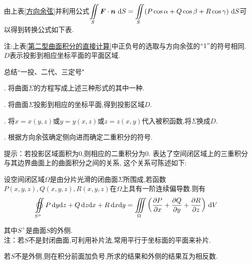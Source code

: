 \ttheorem[直接转换为二重积分计算]
由上表\ref{方向余弦}并利用公式$\displaystyle \iint\limits_{S}\bm{F}\cdot \bm{n}\,\,{\rm{d}} S=\iint\limits_{S}(P\cos \alpha +Q\cos \beta +R\cos \gamma )\,\,{\rm{d}} S$可以得到转换公式如下表.
\begin{table}[h]
	\centering
	\renewcommand{\arraystretch}{1.6}
	\caption{转换为二重积分计算的计算公式}
	\renewcommand{\arraystretch}{1}
	\label{第二型曲面积分的直接计算}
\end{table} 
\par 注:上表\ref{第二型曲面积分的直接计算}中正负号的选取与方向余弦的$``1"$的符号相同.$D$表示投影到相应坐标平面的平面区域.

\inference[转换为二重积分计算第二型曲面积分]
\noindent \quad 总结\quad ``一投、二代、三定号"
\par {}. 将曲面$\Sigma$的方程写成上述三种形式的其中一种.
\par {}. 将曲面$\Sigma$投影到相应的坐标平面,得到投影区域$D$.
\par {}. 将$x=x(y,z)$或$y=y(x,z)$或$z=z(x,y)$代入被积函数,将$\Sigma $换成$D$.
\par {}. 根据方向余弦确定侧向进而确定二重积分的符号.

\quad 提示：若投影区域面积为0,则相应的二重积分为0.
\newpage
\theorem[高斯公式]
表达了空间闭区域上的三重积分与其边界曲面上的曲面积分之间的关系, 这个关系可陈述如下:
\par 设空间闭区域$\Omega $是由分片光滑的闭曲面$\Sigma $所围成,若函数$P(x, y, z),Q(x, y, z),R(x, y, z)$在$\Omega $上具有一阶连续偏导数.则有
\begin{equation}
	\oiint\limits_{S^+}P \,\d y\d z+Q\,\d z\d x+R\,\d x\d y=\iiint\limits_{\Omega}\left( \frac{\partial P}{\partial x}+\frac{\partial Q}{\partial y}+\frac{\partial R}{\partial z}\right)\,\d V 
\end{equation}
\par 其中$S^+$是曲面$S$的外侧.\\
注：若$S$不是封闭曲面,可利用补片法,常用平行于坐标面的平面来补片.
\par 若$S$不是外侧,则在积分前面加负号,所求的结果和外侧的结果互为相反数.

